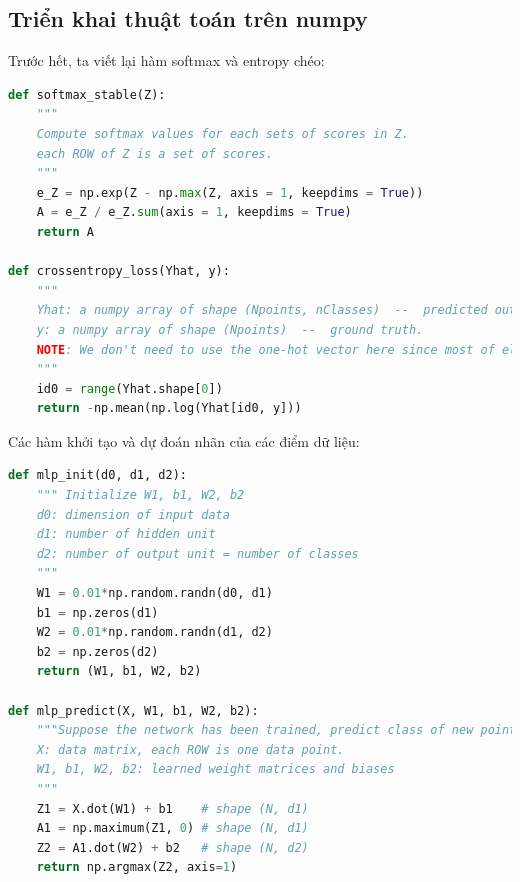 \subsection{Triển khai thuật toán trên numpy}
Trước hết, ta viết lại hàm softmax và entropy chéo:
\begin{lstlisting}[language=Python]
def softmax_stable(Z):
    """
    Compute softmax values for each sets of scores in Z.
    each ROW of Z is a set of scores.    
    """
    e_Z = np.exp(Z - np.max(Z, axis = 1, keepdims = True))
    A = e_Z / e_Z.sum(axis = 1, keepdims = True)
    return A

def crossentropy_loss(Yhat, y):
    """
    Yhat: a numpy array of shape (Npoints, nClasses)  --  predicted output 
    y: a numpy array of shape (Npoints)  --  ground truth. 
    NOTE: We don't need to use the one-hot vector here since most of elements are zeros. When programming in numpy, in each row of Yhat, we need to access to the corresponding index only.
    """
    id0 = range(Yhat.shape[0])
    return -np.mean(np.log(Yhat[id0, y]))
\end{lstlisting}
Các hàm khởi tạo và dự đoán nhãn của các điểm dữ liệu:
\begin{lstlisting}[language=Python]
def mlp_init(d0, d1, d2):
    """ Initialize W1, b1, W2, b2 
    d0: dimension of input data 
    d1: number of hidden unit 
    d2: number of output unit = number of classes
    """
    W1 = 0.01*np.random.randn(d0, d1)
    b1 = np.zeros(d1)
    W2 = 0.01*np.random.randn(d1, d2)
    b2 = np.zeros(d2)
    return (W1, b1, W2, b2)

def mlp_predict(X, W1, b1, W2, b2):
    """Suppose the network has been trained, predict class of new points. 
    X: data matrix, each ROW is one data point.
    W1, b1, W2, b2: learned weight matrices and biases 
    """
    Z1 = X.dot(W1) + b1    # shape (N, d1)
    A1 = np.maximum(Z1, 0) # shape (N, d1)
    Z2 = A1.dot(W2) + b2   # shape (N, d2)
    return np.argmax(Z2, axis=1)

\end{lstlisting}
 
